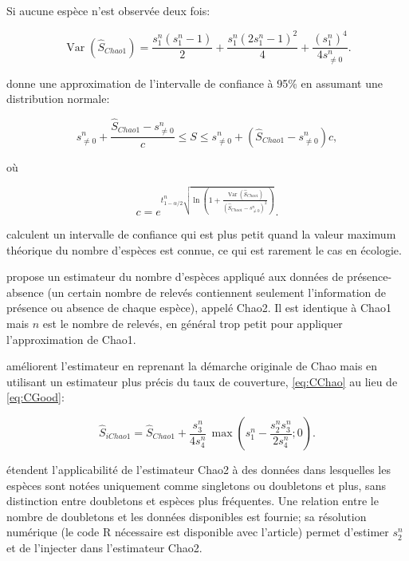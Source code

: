 \documentclass[
  11pt,
  french,
  a4paper,
  extrafontsizes,onecolumn,openright
  ]{memoir}
\begin{document}
Si aucune espèce n'est observée deux fois:

\begin{equation}
  \label{eq:VarChao1sansf2}
  \operatorname{Var}{\left({\hat{S}}_\mathit{Chao1}\right)}
  = \frac{s^{n}_{1}\left(s^{n}_{1}-1\right)}{2}
  + \frac{s^{n}_{1}{\left(2s^{n}_{1} -1\right)}^2}{4}
  + \frac{{\left(s^{n}_{1}\right)}^4}{4s^{n}_{\ne 0}}.
\end{equation}

\textcite{Chao1987} donne une approximation de l'intervalle de confiance à 95\% en assumant une distribution normale:

\begin{equation}
  \label{eq:ICChao1}
  s^{n}_{\ne 0}+\frac{{\hat{S}}_\mathit{Chao1}-{s^{n}_{\ne 0}}}{c}\le S\le {s^{n}_{\ne 0}}+\left({\hat{S}}_\mathit{Chao1}-{s^{n}_{\ne 0}}\right)c,
\end{equation}

où

\begin{equation}
  \label{eq:ICChao1c}
  c=e^{t^{n}_{1-{\alpha}/{2}}\sqrt{\ln\left(1+\frac{\operatorname{Var}\left({\hat{S}}_\mathit{Chao1}\right)}{{\left({\hat{S}}_\mathit{Chao1}-{s^{n}_{\ne 0}}\right)}^2}\right)}}.
\end{equation}

\textcite[eq. 8]{Eren2012} calculent un intervalle de confiance qui est plus petit quand la valeur maximum théorique du nombre d'espèces est connue, ce qui est rarement le cas en écologie.

\textcite{Chao1987} propose un estimateur du nombre d'espèces appliqué aux données de présence-absence (un certain nombre de relevés contiennent seulement l'information de présence ou absence de chaque espèce), appelé Chao2. Il est identique à Chao1 mais \(n\) est le nombre de relevés, en général trop petit pour appliquer l'approximation de Chao1.

\textcite{Chiu2014a} améliorent l'estimateur en reprenant la démarche originale de Chao mais en utilisant un estimateur plus précis du taux de couverture, \eqref{eq:CChao} au lieu de \eqref{eq:CGood}:

\begin{equation}
  \label{eq:iChao1}
  {\hat{S}}_\mathit{iChao1} 
  = {\hat{S}}_\mathit{Chao1} 
  + \frac{s^{n}_{3}}{4s^{n}_{4}}\,
  \max\left(s^{n}_{1}-\frac{s^{n}_{2}s^{n}_{3}}{2s^{n}_{4}};0\right).
\end{equation}

\textcite{Chao2017} étendent l'applicabilité de l'estimateur Chao2 à des données dans lesquelles les espèces sont notées uniquement comme singletons ou doubletons et plus, sans distinction entre doubletons et espèces plus fréquentes.
Une relation entre le nombre de doubletons et les données disponibles est fournie; sa résolution numérique (le code R nécessaire est disponible avec l'article) permet d'estimer \(s^{n}_{2}\) et de l'injecter dans l'estimateur Chao2.
\end{document}
